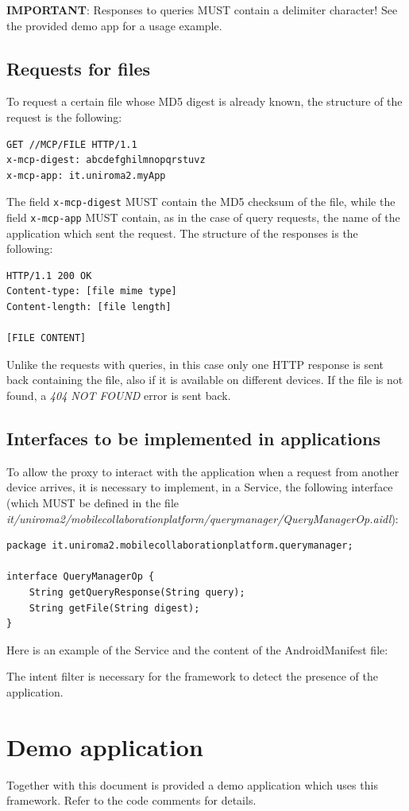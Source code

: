 \documentclass[12pt, a4paper, oneside]{book}
\begin{document}
\begin{framed}
\textbf{IMPORTANT}: Responses to queries MUST contain a delimiter character! See the provided demo app for a usage example.
\end{framed}

\newpage
\section{Requests for files}
To request a certain file whose MD5 digest is already known, the structure of the request is the following:
\begin{verbatim}
GET //MCP/FILE HTTP/1.1
x-mcp-digest: abcdefghilmnopqrstuvz
x-mcp-app: it.uniroma2.myApp
\end{verbatim}
The field \texttt{x-mcp-digest} MUST contain the MD5 checksum of the file, while the field \texttt{x-mcp-app} MUST contain, as in the case of query requests, the name of the application which sent the request.
The structure of the responses is the following:
\begin{verbatim}
HTTP/1.1 200 OK
Content-type: [file mime type]
Content-length: [file length]

[FILE CONTENT]
\end{verbatim}
Unlike the requests with queries, in this case only one HTTP response is sent back containing the file, also if it is available on different devices. If the file is not found, a \textit{404 NOT FOUND} error is sent back.

\section{Interfaces to be implemented in applications}
To allow the proxy to interact with the application when a request from another device arrives, it is necessary to implement, in a Service, the following interface (which MUST be defined in the file \textit{it/uniroma2/mobilecollaborationplatform/querymanager/QueryManagerOp.aidl}):
\begin{verbatim}
package it.uniroma2.mobilecollaborationplatform.querymanager;

interface QueryManagerOp {
	String getQueryResponse(String query);
	String getFile(String digest);
}
\end{verbatim}

Here is an example of the Service and the content of the AndroidManifest file:
\lstset{language=Java, tabsize=2, basicstyle=\footnotesize , breaklines=true}

\lstset{language=XML, tabsize=2, basicstyle=\footnotesize , breaklines=true}

The intent filter is necessary for the framework to detect the presence of the application.

\chapter{Demo application}
Together with this document is provided a demo application which uses this framework. Refer to the code comments for details.
\end{document}
